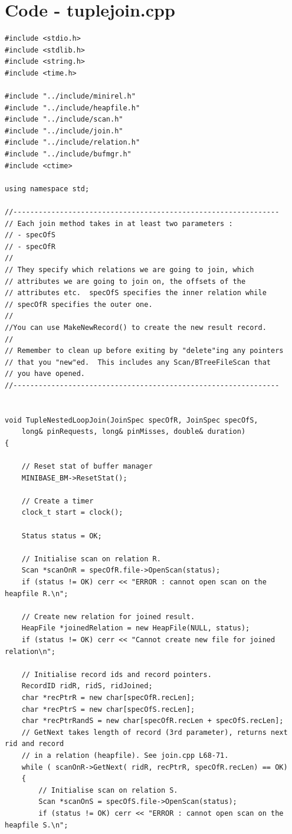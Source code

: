 \documentclass{article}
\begin{document}
\section{Code - tuplejoin.cpp}
\begin{lstlisting}
#include <stdio.h>
#include <stdlib.h>
#include <string.h>
#include <time.h>

#include "../include/minirel.h"
#include "../include/heapfile.h"
#include "../include/scan.h"
#include "../include/join.h"
#include "../include/relation.h"
#include "../include/bufmgr.h"
#include <ctime>

using namespace std;

//---------------------------------------------------------------
// Each join method takes in at least two parameters :
// - specOfS
// - specOfR
//
// They specify which relations we are going to join, which 
// attributes we are going to join on, the offsets of the 
// attributes etc.  specOfS specifies the inner relation while
// specOfR specifies the outer one.
//
//You can use MakeNewRecord() to create the new result record.
//
// Remember to clean up before exiting by "delete"ing any pointers
// that you "new"ed.  This includes any Scan/BTreeFileScan that 
// you have opened.
//---------------------------------------------------------------


void TupleNestedLoopJoin(JoinSpec specOfR, JoinSpec specOfS, 
	long& pinRequests, long& pinMisses, double& duration)
{

	// Reset stat of buffer manager
	MINIBASE_BM->ResetStat();

	// Create a timer
	clock_t start = clock();

	Status status = OK;
	
	// Initialise scan on relation R.
	Scan *scanOnR = specOfR.file->OpenScan(status);
	if (status != OK) cerr << "ERROR : cannot open scan on the heapfile R.\n";
	
	// Create new relation for joined result.
	HeapFile *joinedRelation = new HeapFile(NULL, status); 
	if (status != OK) cerr << "Cannot create new file for joined relation\n";

	// Initialise record ids and record pointers.
	RecordID ridR, ridS, ridJoined;
	char *recPtrR = new char[specOfR.recLen];
	char *recPtrS = new char[specOfS.recLen];
	char *recPtrRandS = new char[specOfR.recLen + specOfS.recLen];
	// GetNext takes length of record (3rd parameter), returns next rid and record
	// in a relation (heapfile). See join.cpp L68-71.
	while ( scanOnR->GetNext( ridR, recPtrR, specOfR.recLen) == OK) 
	{
		// Initialise scan on relation S.
		Scan *scanOnS = specOfS.file->OpenScan(status);
		if (status != OK) cerr << "ERROR : cannot open scan on the heapfile S.\n";
		

\end{lstlisting}
\end{document}
